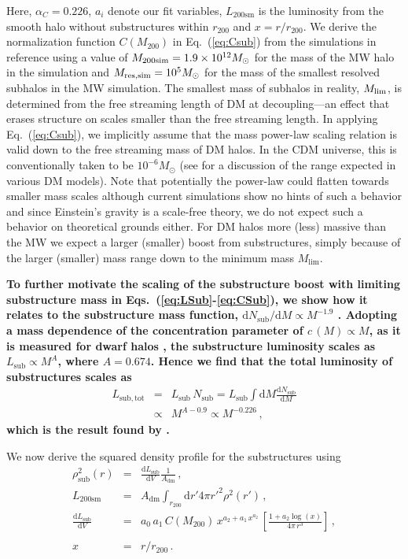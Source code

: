 \documentclass[10pt,aps,pra,reprint,amsmath,amsfonts,amssymb,showpacs,nofootinbib,floatfix]{revtex4-1}
\def\C#1{{\bf #1}}
\newcommand{\rmn}{\mathrm}
\newcommand{\sub}{\rmn{sub}}
\newcommand{\msun}{M_\odot}
\newcommand{\sm}{\rmn{sm}}
\newcommand{\dd}{\rmn{d}}
\newcommand{\rvir}{r_{200}}
\newcommand{\mvir}{M_{200}}
\begin{document}
Here, $\alpha_C=0.226$, $a_i$ denote our fit variables, $L_{200\sm}$
is the luminosity from the smooth halo without substructures within
$\rvir$ and $x= r/\rvir$.  We derive the normalization function
$C(\mvir)$ in Eq.~(\ref{eq:Csub}) from the simulations in reference
\cite{2008Natur.456...73S} using a value of $M_{\rm
  200sim}=1.9\times10^{12}\msun$ for the mass of the MW halo in the
simulation and $M_{\rm res,sim}=10^5\msun$ for the mass of the
smallest resolved subhalos in the MW simulation.  The smallest mass of
subhalos in reality, $M_{\rm lim}$, is determined from the free
streaming length of DM at decoupling---an effect that erases structure
on scales smaller than the free streaming length. In applying
Eq.~(\ref{eq:Csub}), we implicitly assume that the mass power-law
scaling relation is valid down to the free streaming mass of DM
halos. In the CDM universe, this is conventionally taken to be
$10^{-6}\msun$ \cite{2001PhRvD..64h3507H, 2005JCAP...08..003G} (see
\cite{2009NJPh...11j5027B} for a discussion of the range expected in
various DM models). Note that potentially the power-law could flatten
towards smaller mass scales although current simulations show no hints
of such a behavior and since Einstein's gravity is a scale-free
theory, we do not expect such a behavior on theoretical grounds
either.  For DM halos more (less) massive than the MW we expect a
larger (smaller) boost from substructures, simply because of the
larger (smaller) mass range down to the minimum mass $M_\rmn{lim}$.

\C{To further motivate the scaling of the substructure boost with
  limiting substructure mass in Eqs.~(\ref{eq:LSub}-\ref{eq:CSub}), we
  show how it relates to the substructure mass function, $\dd
  N_\sub/\dd M \propto M^{-1.9}$ \cite{2008MNRAS.391.1685S}. Adopting
  a mass dependence of the concentration parameter of $c\,(M)\propto
  M$, as it is measured for dwarf halos \cite{}, the substructure
  luminosity scales as $L_\sub\propto M^A$, where $A=0.674$. Hence we
  find that the total luminosity of substructures scales as
\begin{eqnarray}
  L_\rmn{sub,tot} &=& L_\sub\,N_\sub = L_\sub 
\int \dd M \frac{\dd N_\sub}{\dd M} \nonumber\\
 &\propto& M^{A-0.9} \propto M^{-0.226}\,,
\end{eqnarray}
which is the result found by \cite{2008Natur.456...73S}.}

We now derive the squared density profile for the substructures
using
\begin{eqnarray}
\rho_\rmn{sub}^2(r) &=& \frac{\dd L_\rmn{sub}}{\dd V} \frac{1}{A_{\rmn{dm}}}\,,\label{eq:rho_sub}\\
L_{200\sm} &=&  A_{\rmn{dm}} \int_{\rvir} \dd r' 4\pi r'^2 \rho^2(r')\,,\label{eq:Lsm}\\
 \frac{\dd L_\rmn{sub}}{\dd V} &=& a_0\,a_1\,C(\mvir)\,x^{a_2+a_1\,x^{a_2}}\,
\left[\frac{1+a_2\log(x)}{4\pi\,r^3}\right]\,,\nonumber\\
\\
x &=& r/\rvir\,.\label{eq:xvir}
\end{eqnarray} 
\end{document}

